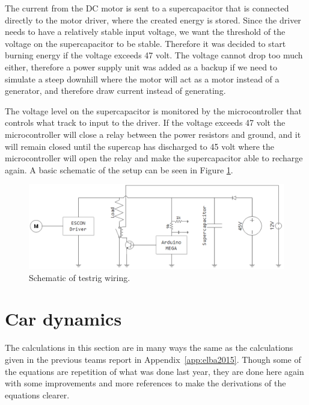 The current from the DC motor is sent to a supercapacitor that is connected directly to the motor driver, where the created energy is stored. Since the driver needs to have a relatively stable input voltage, we want the threshold of the voltage on the supercapacitor to be stable. Therefore it was decided to start burning energy if the voltage exceeds 47 volt. The voltage cannot drop too much either, therefore a power supply unit was added as a backup if we need to simulate a steep downhill where the motor will act as a motor instead of a generator, and therefore draw current instead of generating. 

The voltage level on the supercapacitor is monitored by the microcontroller that controls what track to input to the driver. If the voltage exceeds 47 volt the microcontroller will close a relay between the power resistors and ground, and it will remain closed until the supercap has discharged to 45 volt where the microcontroller will open the relay and make the supercapacitor able to recharge again. A basic schematic of the setup can be seen in Figure \ref{fig:testrig_schematic}.

\begin{figure}[H]
    \label{fig:testrig_schematic}
    \centering
    \includegraphics[width=\textwidth]{./img/testrig_schematic.png}
    \caption{Schematic of testrig wiring.}
\end{figure}

\section{Car dynamics} \label{sec:cardynamics}
The calculations in this section are in many ways the same as the calculations
given in the previous teams report in Appendix~\ref{app:elba2015}. Though some
of the equations are repetition of what was done last year, they are
done here again with some improvements and more references to make the
derivations of the equations clearer.

